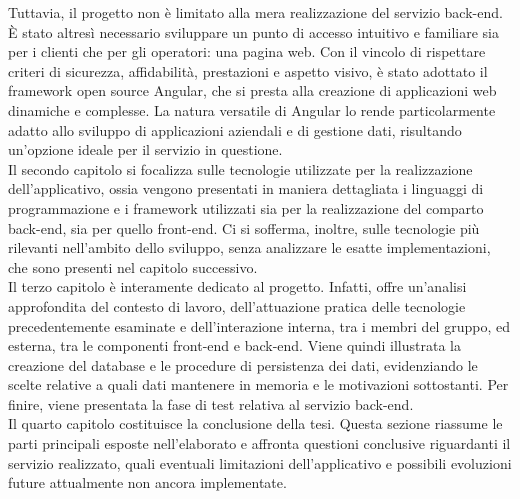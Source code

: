Tuttavia, il progetto non è limitato alla mera realizzazione del servizio back-end. È stato altresì necessario sviluppare un punto di accesso intuitivo e familiare sia per i clienti che per gli operatori: una pagina web. Con il vincolo di rispettare criteri di sicurezza, affidabilità, prestazioni e aspetto visivo, è stato adottato il framework open source Angular, che si presta alla creazione di applicazioni web dinamiche e complesse. La natura versatile di Angular lo rende particolarmente adatto allo sviluppo di applicazioni aziendali e di gestione dati, risultando un'opzione ideale per il servizio in questione.\\
Il secondo capitolo si focalizza sulle tecnologie utilizzate per la realizzazione dell’applicativo, ossia vengono presentati in maniera dettagliata i linguaggi di programmazione e i framework utilizzati sia per la realizzazione del comparto back-end, sia per quello front-end. Ci si sofferma, inoltre, sulle tecnologie più rilevanti nell'ambito dello sviluppo, senza analizzare le esatte implementazioni, che sono presenti nel capitolo successivo.\\
Il terzo capitolo è interamente dedicato al progetto. Infatti, offre un'analisi approfondita del contesto di lavoro, dell'attuazione pratica delle tecnologie precedentemente esaminate e dell'interazione interna, tra i membri del gruppo, ed esterna, tra le componenti front-end e back-end. Viene quindi illustrata la creazione del database e le procedure di persistenza dei dati, evidenziando le scelte relative a quali dati mantenere in memoria e le motivazioni sottostanti. Per finire, viene presentata la fase di test relativa al servizio back-end.\\
Il quarto capitolo costituisce la conclusione della tesi. Questa sezione riassume le parti principali esposte nell'elaborato e affronta questioni conclusive riguardanti il servizio realizzato, quali eventuali limitazioni dell’applicativo e possibili evoluzioni future attualmente non ancora implementate.




